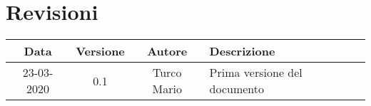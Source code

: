 %
%	 
%

\chapter*{Revisioni}
\begin{center}
    \begin{table}[h]
        \begin{tabularx}{\textwidth}[t]{|c|c|c|X|}
            \hline
            Data & Versione & Autore & Descrizione\\
            \hline
            23-03-2020 & 0.1 & Turco Mario & Prima versione del documento\\
            \hline
        \end{tabularx}
    \end{table}
\end{center}